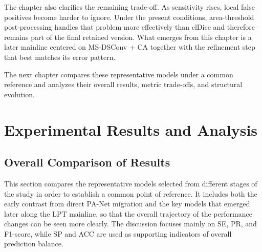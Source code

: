 \documentclass[a4paper,11pt]{article}
\begin{document}
The chapter also clarifies the remaining trade-off. As sensitivity rises, local false positives become harder to ignore. Under the present conditions, area-threshold post-processing handles that problem more effectively than clDice and therefore remains part of the final retained version. What emerges from this chapter is a later mainline centered on MS-DSConv + CA together with the refinement step that best matches its error pattern.

The next chapter compares these representative models under a common reference and analyzes their overall results, metric trade-offs, and structural evolution.

\section{Experimental Results and Analysis}

\subsection{Overall Comparison of Results}
This section compares the representative models selected from different stages of the study in order to establish a common point of reference. It includes both the early contrast from direct PA-Net migration and the key models that emerged later along the LPT mainline, so that the overall trajectory of the performance changes can be seen more clearly. The discussion focuses mainly on SE, PR, and F1-score, while SP and ACC are used as supporting indicators of overall prediction balance.

\begin{table}[!htbp]
\centering
\caption{Overall comparison of representative models in Chapter 4}
\label{tab:chapter4_overall_en}
\end{table}
\end{document}
